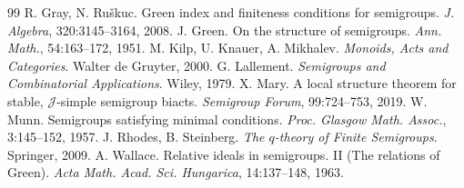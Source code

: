 \documentclass[twoside,a4paper,12pt,reqno]{amsart}
\theoremstyle{plain}
\theoremstyle{definition}
\renewcommand{\r}{\mbox{${\mathcal{R}}$}}
\renewcommand{\j}{\mbox{${\mathcal{J}}$}}
\begin{document}
\begin{thebibliography}{99}
R.\! Gray, N.\! Ru{\v s}kuc.  Green index and finiteness conditions for semigroups.  \textit{J. Algebra}, 320:3145--3164, 2008.
J.\! Green.  On the structure of semigroups.  \textit{Ann. Math.}, 54:163--172, 1951.
M.\! Kilp, U.\! Knauer, A.\! Mikhalev.  \textit{Monoids, Acts and Categories}.  Walter de Gruyter, 2000.
G.\! Lallement.  \textit{Semigroups and Combinatorial Applications}.  Wiley, 1979.
X.\! Mary.  A local structure theorem for stable, $\j$-simple semigroup biacts.  \textit{Semigroup Forum}, 99:724--753, 2019.
W.\! Munn.  Semigroups satisfying minimal conditions.  \textit{Proc. Glasgow Math. Assoc.}, 3:145--152, 1957.
J.\! Rhodes, B.\! Steinberg.  \textit{The $q$-theory of Finite Semigroups}.  Springer, 2009.
A.\! Wallace.  Relative ideals in semigroups.  II (The relations of Green).  \textit{Acta Math. Acad. Sci. Hungarica}, 14:137--148, 1963.
\end{thebibliography}
\end{document}
